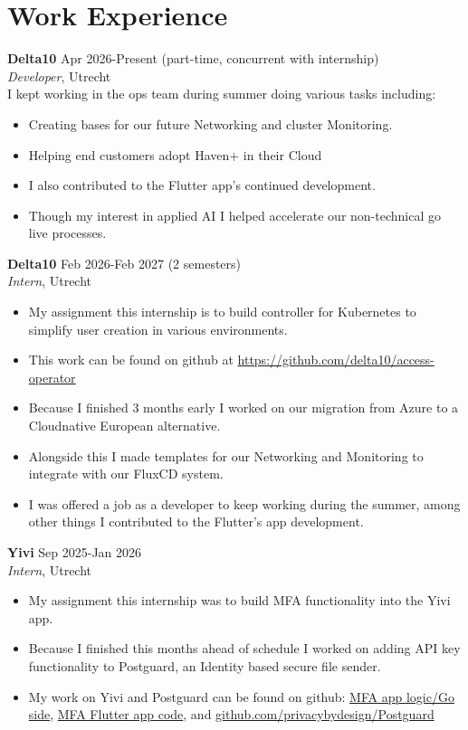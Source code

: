 \documentclass{article}
\begin{document}
\section*{Work Experience}
\textbf{Delta10} \hfill Apr 2026-Present (part-time, concurrent with internship) \\
\textit{Developer}, Utrecht \\
I kept working in the ops team during summer doing various tasks including:
\begin{itemize}[noitemsep]
    \item Creating bases for our future Networking and cluster Monitoring.
    \item Helping end customers adopt Haven+ in their Cloud
    \item I also contributed to the Flutter app's continued development.
    \item Though my interest in applied AI I helped accelerate our non-technical go live processes.
    \end{itemize}
\textbf{Delta10} \hfill Feb 2026-Feb 2027 (2 semesters) \\
\textit{Intern}, Utrecht
\begin{itemize}[noitemsep]
    \item My assignment this internship is to build controller for Kubernetes to simplify user creation in various environments.
    \item This work can be found on github at \url{https://github.com/delta10/access-operator}
    \item Because I finished 3 months early I worked on our migration from Azure to a Cloudnative European alternative.
    \item Alongside this I made templates for our Networking and Monitoring to integrate with our FluxCD system.
    \item I was offered a job as a developer to keep working during the summer, among other things I contributed to the Flutter's app development.
    \end{itemize}
\textbf{Yivi} \hfill Sep 2025-Jan 2026 \\
\textit{Intern}, Utrecht
\begin{itemize}[noitemsep]
    \item My assignment this internship was to build MFA functionality into the Yivi app.
    \item Because I finished this months ahead of schedule I worked on adding API key functionality to Postguard, an Identity based secure file sender.
    \item My work on Yivi and Postguard can be found on github: \href{https://github.com/privacybydesign/TwoFaGo}{MFA app logic/Go side}, \href{https://github.com/FayKn/irmamobile/tree/eudi-MFA}{MFA Flutter app code}, and \href{https://github.com/privacybydesign/Postguard}{github.com/privacybydesign/Postguard}
\end{itemize}
\end{document}
